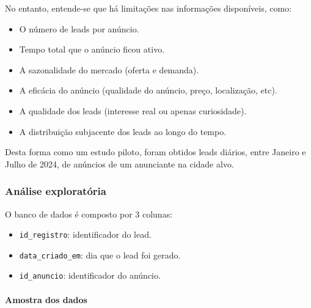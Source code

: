 \documentclass[
]{article}
\newenvironment{Shaded}{\begin{snugshade}}{\end{snugshade}}
\newcommand{\AttributeTok}[1]{\textcolor[rgb]{0.13,0.29,0.53}{#1}}
\newcommand{\FunctionTok}[1]{\textcolor[rgb]{0.13,0.29,0.53}{\textbf{#1}}}
\newcommand{\NormalTok}[1]{#1}
\newcommand{\OtherTok}[1]{\textcolor[rgb]{0.56,0.35,0.01}{#1}}
\newcommand{\SpecialCharTok}[1]{\textcolor[rgb]{0.81,0.36,0.00}{\textbf{#1}}}
\newcommand{\StringTok}[1]{\textcolor[rgb]{0.31,0.60,0.02}{#1}}
\providecommand{\tightlist}{%
  \setlength{\itemsep}{0pt}\setlength{\parskip}{0pt}}
\begin{document}
No entanto, entende-se que há limitações nas informações disponíveis,
como:

\begin{itemize}
\tightlist
\item
  O número de leads por anúncio.
\item
  Tempo total que o anúncio ficou ativo.
\item
  A sazonalidade do mercado (oferta e demanda).
\item
  A eficácia do anúncio (qualidade do anúncio, preço, localização, etc).
\item
  A qualidade dos leads (interesse real ou apenas curiosidade).
\item
  A distribuição subjacente dos leads ao longo do tempo.
\end{itemize}

Desta forma como um estudo piloto, foram obtidos leads diários, entre
Janeiro e Julho de 2024, de anúncios de um anunciante na cidade alvo.

\subsubsection{Análise exploratória}\label{anuxe1lise-exploratuxf3ria}

O banco de dados é composto por 3 colunas:

\begin{itemize}
\tightlist
\item
  \texttt{id\_registro}: identificador do lead.
\item
  \texttt{data\_criado\_em}: dia que o lead foi gerado.
\item
  \texttt{id\_anuncio}: identificador do anúncio.
\end{itemize}

\paragraph{Amostra dos dados}\label{amostra-dos-dados}

\begin{Shaded}
\end{Shaded}
\end{document}
